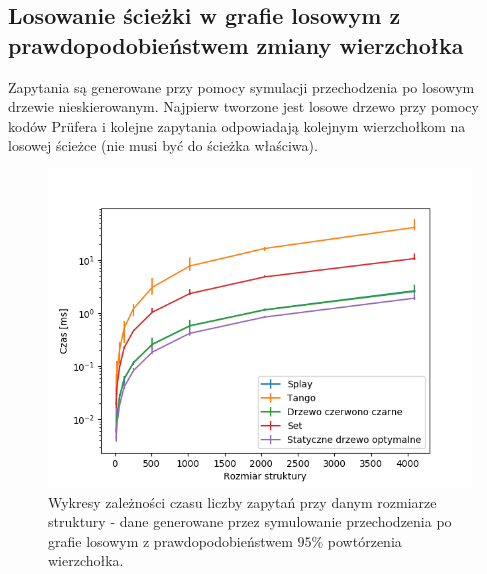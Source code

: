 \documentclass[declaration,shortabstract]{iithesis}
\theoremstyle{thm}
\theoremstyle{remark}
\theoremstyle{plain}
\theoremstyle{plain}
\theoremstyle{plain}
\begin{document}
\subsection{Losowanie ścieżki w grafie losowym z prawdopodobieństwem zmiany wierzchołka}
Zapytania są generowane przy pomocy symulacji przechodzenia po losowym drzewie nieskierowanym. Najpierw tworzone jest losowe drzewo przy pomocy kodów Prüfera i kolejne zapytania odpowiadają kolejnym wierzchołkom na losowej ścieżce (nie musi być do ścieżka właściwa).
\begin{figure}[H]  

\centering
    \includegraphics[scale=0.5]{wykresy/randwalk5_main.png}
      \caption{Wykresy zależności czasu liczby zapytań przy danym rozmiarze struktury - dane generowane przez symulowanie przechodzenia po grafie losowym z prawdopodobieństwem  \(95\%\) powtórzenia wierzchołka.}  
    \label{fig:zigzig} 
\end{figure}
\end{document}
